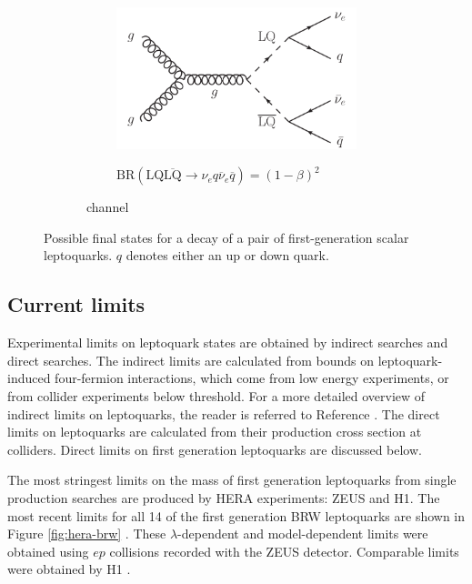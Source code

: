 \begin{figure}
  \begin{subfigure}[b]{\textwidth}
    \begin{subfigure}[b]{0.45\textwidth}
      \includegraphics[width=\textwidth]{tex/theory/fig/LQ_pair_decay_nunujj}
    \end{subfigure}
    \begin{subfigure}[b]{0.5\textwidth}
      $\text{BR}(\text{LQ}\overline{\text{LQ}} \rightarrow \nu_{e}q \overline{\nu}_{e}\overline{q}) = (1-\beta)^2$
    \end{subfigure}
    \caption{\nunujj~channel}
    \label{fig:feynman_LO_LQ_pair_nunujj}
  \end{subfigure}
  \caption{Possible final states for a decay of a pair of first-generation scalar leptoquarks.
    $q$ denotes either an up or down quark.}
  \label{fig:feynman_LQ_decay}
\end{figure}

\subsection{Current limits}

Experimental limits on leptoquark states are obtained by
indirect searches and direct searches.  The indirect
limits are calculated from bounds on leptoquark-induced                                                     
four-fermion interactions, which come from low
energy experiments, or from collider experiments below threshold.
For a more detailed overview of indirect limits on leptoquarks,
the reader is referred to Reference \cite{pdg}.
The direct limits on leptoquarks are calculated from their production
cross section at colliders.  Direct limits on first generation
leptoquarks are discussed below.

The most stringest limits on the mass of first generation leptoquarks
from single production searches 
are produced by HERA experiments: ZEUS and H1.
The most recent limits for all 14 of the first generation
BRW leptoquarks are shown in Figure \ref{fig:hera-brw} \cite{zeus}.
These $\lambda$-dependent and model-dependent limits were obtained
using $ep$ collisions recorded with the ZEUS detector.
Comparable limits were obtained by H1 \cite{h1}.

